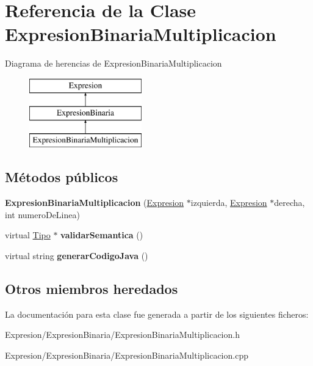 \hypertarget{class_expresion_binaria_multiplicacion}{\section{Referencia de la Clase Expresion\-Binaria\-Multiplicacion}
\label{class_expresion_binaria_multiplicacion}
}
Diagrama de herencias de Expresion\-Binaria\-Multiplicacion\begin{figure}[H]
\begin{center}
\leavevmode
\includegraphics[height=3.000000cm]{class_expresion_binaria_multiplicacion}
\end{center}
\end{figure}
\subsection*{Métodos públicos}
\begin{DoxyCompactItemize}
\item 
\hypertarget{class_expresion_binaria_multiplicacion_ada46004d03bcf9818c0968b498f9f78b}{{\bfseries Expresion\-Binaria\-Multiplicacion} (\hyperlink{class_expresion}{Expresion} $\ast$izquierda, \hyperlink{class_expresion}{Expresion} $\ast$derecha, int numero\-De\-Linea)}\label{class_expresion_binaria_multiplicacion_ada46004d03bcf9818c0968b498f9f78b}

\item 
\hypertarget{class_expresion_binaria_multiplicacion_a15bcc9f381e17053afc4b77470581f6b}{virtual \hyperlink{class_tipo}{Tipo} $\ast$ {\bfseries validar\-Semantica} ()}\label{class_expresion_binaria_multiplicacion_a15bcc9f381e17053afc4b77470581f6b}

\item 
\hypertarget{class_expresion_binaria_multiplicacion_ab94f2121a01f41e924083666a75d3310}{virtual string {\bfseries generar\-Codigo\-Java} ()}\label{class_expresion_binaria_multiplicacion_ab94f2121a01f41e924083666a75d3310}

\end{DoxyCompactItemize}
\subsection*{Otros miembros heredados}


La documentación para esta clase fue generada a partir de los siguientes ficheros\-:\begin{DoxyCompactItemize}
\item 
Expresion/\-Expresion\-Binaria/Expresion\-Binaria\-Multiplicacion.\-h\item 
Expresion/\-Expresion\-Binaria/Expresion\-Binaria\-Multiplicacion.\-cpp\end{DoxyCompactItemize}
